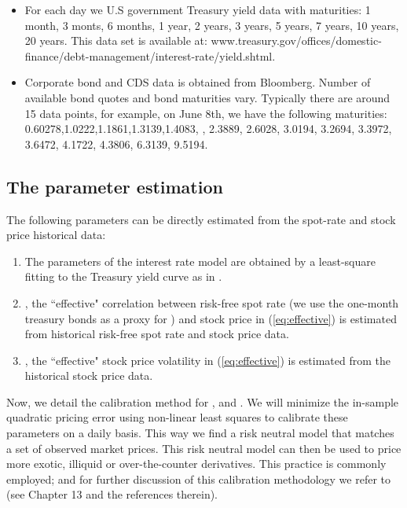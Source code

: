 \documentclass[11pt]{article}
\numberwithin{equation}{section}
\begin{document}
\begin{itemize}
\item For each day we U.S government Treasury yield data with maturities: 1 month, 3 monts, 6 months, 1 year, 2 years, 3 years, 5 years, 7 years, 10 years, 20 years.
This data set is available at: {www.treasury.gov/offices/domestic-finance/debt-management/interest-rate/yield.shtml.}

\item Corporate bond and CDS data is obtained from Bloomberg. Number of available bond quotes and bond maturities vary. Typically there are around 15 data points, for example, on June 8th, we have the following maturities: 0.60278,1.0222,1.1861,1.3139,1.4083, , 2.3889, 2.6028, 3.0194, 3.2694, 3.3972, 3.6472, 4.1722, 4.3806, 6.3139, 9.5194.


\end{itemize}


\subsection{The parameter estimation}\label{sec:parest}

The following parameters can be directly estimated from the spot-rate and stock price historical data:
\begin{enumerate}
\item The parameters of the interest rate model  are obtained by a  least-square fitting to the
Treasury yield curve as in \cite{papa}.
\item , the ``effective" correlation between risk-free
spot rate  (we use the one-month treasury bonds as a proxy for ) and stock price in (\ref{eq:effective}) is estimated from historical risk-free spot rate and
stock price data.
\item , the ``effective" stock price volatility in (\ref{eq:effective})
is estimated from the historical stock price data.
\end{enumerate}


Now, we detail the calibration method for ,  and
. We will minimize the in-sample quadratic pricing error using non-linear least squares to calibrate these parameters on a daily basis. This way we find a risk neutral model that matches a set of observed market prices. This risk neutral model can then be used to price more exotic, illiquid or over-the-counter derivatives. This practice is commonly employed; and for further discussion of this calibration methodology we refer to \cite{cont} (see Chapter 13 and the references therein).
\end{document}
